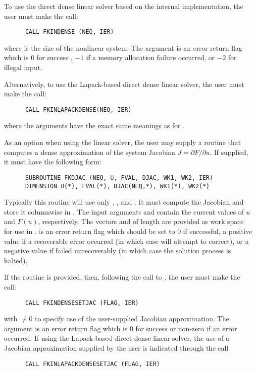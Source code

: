 \begin{Steps}
  To use the direct dense linear solver based on the internal {\kinsol}
  implementation, the user must make the call:
\begin{verbatim}
      CALL FKINDENSE (NEQ, IER)
\end{verbatim}
  where  is the size of the nonlinear system.
  The argument  is an error return flag which is $0$ for success , 
  $-1$ if a memory allocation failure occurred, or $-2$ for illegal input.

  Alternatively, to use the Lapack-based direct dense linear solver, 
  the user must make the call:
\begin{verbatim}
      CALL FKINLAPACKDENSE(NEQ, IER)
\end{verbatim}
  where the arguments have the exact same meanings as for .

  As an option when using the {\dense} linear solver, the user may supply a
  routine that computes a dense approximation of the system Jacobian 
  $J = \partial F / \partial u$. If supplied, it must have the following form:
\begin{verbatim}
      SUBROUTINE FKDJAC (NEQ, U, FVAL, DJAC, WK1, WK2, IER)
      DIMENSION U(*), FVAL(*), DJAC(NEQ,*), WK1(*), WK2(*)
\end{verbatim}
  Typically this routine will use only , , and . 
  It must compute the Jacobian and store it columnwise in .
  The input arguments  and  contain the current
  values of $u$ and $F(u)$, respectively.
  The vectors  and 
  of length  are provided as work space for use in .
   is an error return flag which should be set to $0$ if successful,
  a positive value if a recoverable error occurred (in which case {\kinsol}
  will attempt to correct), or a negative value if  failed
  unrecoverably (in which case the solution process is halted).

  If the  routine is provided, then, 
  following the call to , the user must make the call:
\begin{verbatim}
      CALL FKINDENSESETJAC (FLAG, IER)
\end{verbatim}
  with  $\neq 0$ to specify use of the user-supplied Jacobian
  approximation.  The argument  is an error return flag which is $0$ 
  for success or non-zero if an error occurred.
  If using the Lapack-based direct dense linear solver, the use of a
  Jacobian approximation supplied by the user is indicated through the call
\begin{verbatim}
      CALL FKINLAPACKDENSESETJAC (FLAG, IER)
\end{verbatim}


\end{Steps}

